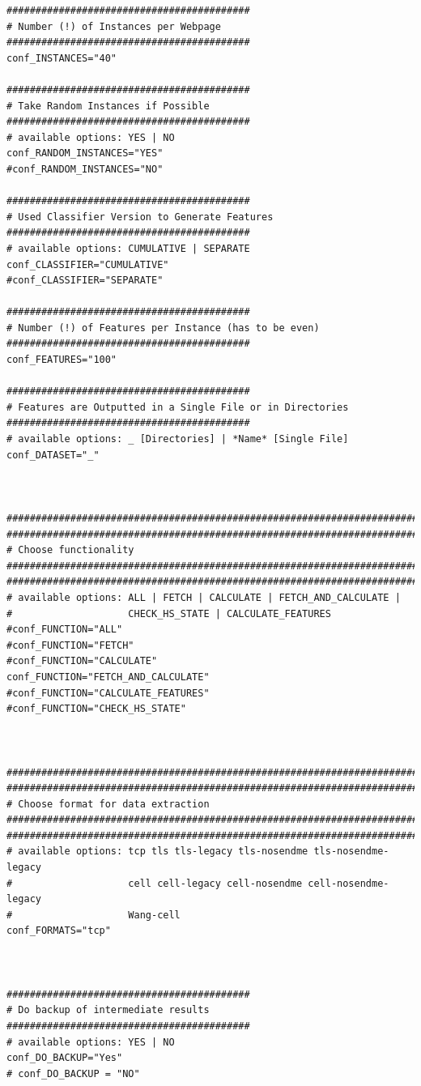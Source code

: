 \begin{verbatim}
##########################################
# Number (!) of Instances per Webpage
##########################################
conf_INSTANCES="40"

##########################################
# Take Random Instances if Possible
##########################################
# available options: YES | NO
conf_RANDOM_INSTANCES="YES"
#conf_RANDOM_INSTANCES="NO"

##########################################
# Used Classifier Version to Generate Features
##########################################
# available options: CUMULATIVE | SEPARATE
conf_CLASSIFIER="CUMULATIVE"
#conf_CLASSIFIER="SEPARATE"

##########################################
# Number (!) of Features per Instance (has to be even)
##########################################
conf_FEATURES="100"

##########################################
# Features are Outputted in a Single File or in Directories
##########################################
# available options: _ [Directories] | *Name* [Single File]
conf_DATASET="_"



#######################################################################
#######################################################################
# Choose functionality
#######################################################################
#######################################################################
# available options: ALL | FETCH | CALCULATE | FETCH_AND_CALCULATE | 
#					 CHECK_HS_STATE | CALCULATE_FEATURES
#conf_FUNCTION="ALL"
#conf_FUNCTION="FETCH"
#conf_FUNCTION="CALCULATE"
conf_FUNCTION="FETCH_AND_CALCULATE"
#conf_FUNCTION="CALCULATE_FEATURES"
#conf_FUNCTION="CHECK_HS_STATE"



#######################################################################
#######################################################################
# Choose format for data extraction
#######################################################################
#######################################################################
# available options: tcp tls tls-legacy tls-nosendme tls-nosendme-legacy 
#					 cell cell-legacy cell-nosendme cell-nosendme-legacy
#					 Wang-cell
conf_FORMATS="tcp"



##########################################
# Do backup of intermediate results
##########################################
# available options: YES | NO
conf_DO_BACKUP="Yes"
# conf_DO_BACKUP = "NO"





\end{verbatim}
